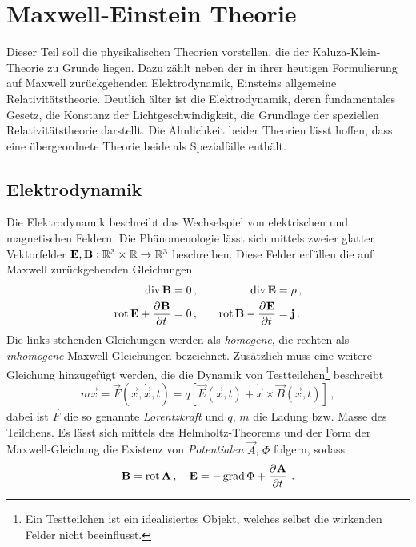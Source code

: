 \chapter{Maxwell-Einstein Theorie}
Dieser Teil soll die physikalischen Theorien vorstellen, die der
Kaluza-Klein-Theorie zu Grunde liegen. Dazu zählt neben der 
in ihrer heutigen Formulierung auf Maxwell zurückgehenden 
Elektrodynamik, Einsteins allgemeine Relativitätstheorie. 
Deutlich älter ist die Elektrodynamik, deren fundamentales Gesetz, die Konstanz
der Lichtgeschwindigkeit, die Grundlage der speziellen Relativitätstheorie
darstellt.
Die Ähnlichkeit beider Theorien lässt hoffen, dass eine 
übergeordnete Theorie beide als Spezialfälle enthält. 
\section{Elektrodynamik}
Die Elektrodynamik beschreibt das Wechselspiel von elektrischen und 
magnetischen Feldern. Die Phänomenologie lässt sich mittels zweier glatter Vektorfelder
$\mathbf{E},\mathbf{B}:\mathbb{R}^3\times\mathbb{R}\to \mathbb{R}^3$ beschreiben.
Diese Felder erfüllen die auf Maxwell zurückgehenden Gleichungen 
\begin{equation}
  \begin{alignedat}{2}
  \Div\vec{B} &= 0    \,,  & \qquad \Div\vec{E} &= \rho
    \,,\\
    \Rot\vec{E}+\dpd{\vec{B}}{t}&=0\,,& \qquad\Rot\vec{B}-\dpd{\vec{E}}{t}&
    =\vec{j}\,.
  \end{alignedat}
\end{equation}
Die links stehenden Gleichungen werden als \emph{homogene}, die rechten als
\emph{inhomogene} Maxwell-Gleichungen bezeichnet. Zusätzlich muss eine weitere
Gleichung hinzugefügt werden, die die Dynamik von Testteilchen\footnote{Ein Testteilchen ist ein idealisiertes Objekt, welches selbst die wirkenden Felder nicht beeinflusst.} beschreibt
\begin{equation}
m\ddot{\vec{x}}=\vec{F}(\vec{x},\dot{\vec{x}},t)
=q\left[\vec{E}(\vec{x},t)+\dot{\vec{x}}\times\vec{B}(\vec{x},t)\right]\,,
\end{equation}
dabei ist $\vec{F}$ die so genannte \emph{Lorentzkraft} und $q$, $m$ die
Ladung bzw. Masse des Teilchens.
Es lässt sich mittels des Helmholtz-Theorems und der Form der Maxwell-Gleichung
die Existenz von \emph{Potentialen} $\vec{A}$, $\Phi$ folgern, sodass
\begin{equation}
\vec{B}=\Rot \vec{A}\,,\quad
\vec{E}=-\Grad\Phi+\dpd{\vec{A}}{t}\,.\label{eq:Vecpot}
\end{equation}
